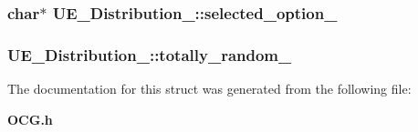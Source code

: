 \subsubsection[{selected\_\-option\_\-}]{\setlength{\rightskip}{0pt plus 5cm}char$\ast$ {\bf UE\_\-Distribution\_\-::selected\_\-option\_\-}}\label{structUE__Distribution___20fd590aad2d650efd061ac430d1e0a4}


\subsubsection[{totally\_\-random\_\-}]{ {\bf UE\_\-Distribution\_\-::totally\_\-random\_\-}}\label{structUE__Distribution___87e979d206953e5bc9410c7db36c8f8b}




The documentation for this struct was generated from the following file:\begin{CompactItemize}
\item 
{\bf OCG.h}\end{CompactItemize}
